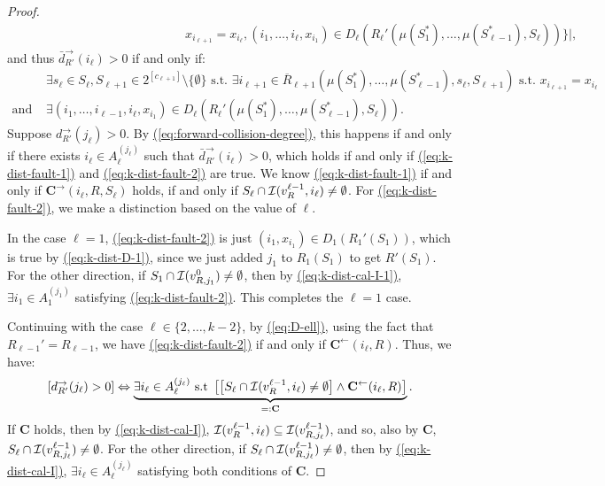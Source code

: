 \documentclass{theoretics}
\newcommand{\eq}[1]{\hyperref[eq:#1]{(\ref*{eq:#1})}}
\renewcommand{\>}{\rangle}
\newcommand{\<}{\langle}
\renewcommand{\(}{\left(}
\renewcommand{\)}{\right)}
\begin{document}
\begin{proof}
\begin{align*}
&\qquad\qquad\qquad\qquad\qquad\qquad\quad\, x_{i_{\ell+1}}=x_{i_{\ell}}, (i_1,\dots,i_{\ell},x_{i_1})\in D_{\ell}(R_{\ell}'(\mu(S_1^*),\dots,\mu(S_{\ell-1}^*),S_{\ell}))\}|,
\end{align*}
and thus $\bar{d}_{R'}^{\rightarrow}(i_{\ell})>0$ if and only if:
\begin{align}
& \exists s_{\ell}\in S_{\ell},S_{\ell+1}\in 2^{[c_{\ell+1}]}\setminus\{\emptyset\}\mbox{ s.t. }\exists i_{\ell+1}\in \overline{R}_{\ell+1}(\mu(S_1^*),\dots,\mu(S_{\ell-1}^*),s_{\ell},S_{\ell+1})\mbox{ s.t. }x_{i_{\ell+1}}=x_{i_{\ell}}\label{eq:k-dist-fault-1}\\
\mbox{and }&\exists (i_1,\dots,i_{\ell-1},i_{\ell},x_{i_1})\in D_{\ell}(R_{\ell}'(\mu(S_1^*),\dots,\mu(S_{\ell-1}^*),S_{\ell})).\label{eq:k-dist-fault-2}
\end{align}
Suppose ${d}_{R'}^{\rightarrow}(j_{\ell})>0$. By \eq{forward-collision-degree}, this happens if and only if there exists $i_{\ell}\in A_{\ell}^{(j_{\ell})}$ such that $\bar{d}_{R'}^{\rightarrow}(i_{\ell})>0$, which holds if and only if \eq{k-dist-fault-1} and \eq{k-dist-fault-2} are true.  We know \eq{k-dist-fault-1} if and only if $\mathbf{C}^{\rightarrow}(i_{\ell},R,S_{\ell})$ holds, if and only if $S_{\ell}\cap {\cal I}(v_R^{\ell-1},i_{\ell})\neq \emptyset$. For \eq{k-dist-fault-2}, we make a distinction based on the value of $\ell$. 

In the case $\ell=1$, \eq{k-dist-fault-2} is just $(i_1,x_{i_1})\in D_1(R_1'(S_1))$, which is true by \eq{k-dist-D-1}, since we just added $j_1$ to $R_1(S_1)$ to get $R'(S_1)$. For the other direction, if $S_{1}\cap {\cal I}(v_{R,j_{1}}^{0})\neq\emptyset$, then by \eq{k-dist-cal-I-1}, $\exists i_{1}\in A_{1}^{(j_{1})}$ satisfying \eq{k-dist-fault-2}. This completes the $\ell=1$ case. 

Continuing with the case $\ell\in\{2,\dots,k-2\}$, by \eq{D-ell}, using the fact that $R_{\ell-1}'=R_{\ell-1}$, we have \eq{k-dist-fault-2} if and only if $\mathbf{C}^{\leftarrow}(i_{\ell},R)$. Thus, we have:
\begin{equation*}
	\left[{d}_{R'}^{\rightarrow}(j_{\ell})>0\right] \Leftrightarrow \underbrace{\exists i_{\ell}\in A_{\ell}^{(j_{\ell})}\mbox{ s.t }\left[\left[ S_{\ell}\cap {\cal I}(v_R^{\ell-1},i_{\ell})\neq \emptyset \right]\wedge \mathbf{C}^{\leftarrow}(i_{\ell},R)\right]}_{=:\mathbf{C}}.\label{eq:k-dist-fault-final}
\end{equation*}
If $\mathbf{C}$ holds, then by \eq{k-dist-cal-I}, ${\cal I}(v_R^{\ell-1},i_{\ell})\subseteq {\cal I}(v_{R,j_{\ell}}^{\ell-1})$, and so, also by $\mathbf{C}$, $S_{\ell}\cap {\cal I}(v_{R,j_{\ell}}^{\ell-1})\neq\emptyset$. For the other direction, if $S_{\ell}\cap {\cal I}(v_{R,j_{\ell}}^{\ell-1})\neq\emptyset$, then by \eq{k-dist-cal-I}, $\exists i_{\ell}\in A_{\ell}^{(j_{\ell})}$ satisfying both conditions of $\mathbf{C}$.
\end{proof}
\end{document}
